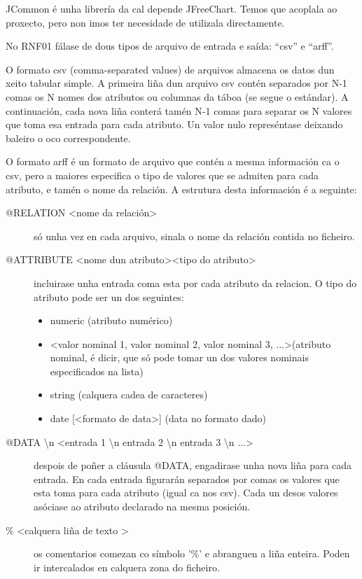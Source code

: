 JCommon é unha librería da cal depende JFreeChart. Temos que acoplala ao proxecto, pero non imos ter necesidade de utilizala directamente.


No RNF01 fálase de dous tipos de arquivo de entrada e saída: ``csv'' e ``arff''.

O formato csv (comma-separated values) de arquivos almacena os datos dun xeito tabular simple. A primeira liña dun arquivo csv contén separados por N-1 comas os N nomes dos atributos ou columnas da táboa (se segue o estándar). A continuación, cada nova liña conterá tamén N-1 comas para separar os N valores que toma esa entrada para cada atributo. Un valor nulo represéntase deixando baleiro o oco correspondente.

O formato arff  é un formato de arquivo que contén a mesma información ca o csv, pero a maiores especifica o tipo de valores que se admiten para cada atributo, e tamén o nome da relación. A estrutura desta información é a seguinte:

\begin{description}
\item[@RELATION \textless nome da relación\textgreater] só unha vez en cada arquivo, sinala o nome da relación contida no ficheiro.
\item[@ATTRIBUTE \textless nome dun atributo\textgreater \textless tipo do atributo\textgreater] incluirase unha entrada coma esta por cada atributo da relacion. O tipo do atributo pode ser un dos seguintes:
\begin{itemize}
\item numeric (atributo numérico)
\item \textless valor nominal 1, valor nominal 2, valor nominal 3, ...\textgreater (atributo nominal, é dicir, que só pode tomar un dos valores nominais especificados na lista)
\item string (calquera cadea de caracteres)
\item date [\textless formato de data\textgreater ] (data no formato dado)
\end{itemize} 
\item[@DATA \textbackslash n \textless entrada 1 \textbackslash n entrada 2 \textbackslash n entrada 3 \textbackslash n ...\textgreater] despois de poñer a cláusula @DATA, engadirase unha nova liña para cada entrada. En cada entrada figurarán separados por comas os valores que esta toma para cada atributo (igual ca nos csv). Cada un desos valores asóciase ao atributo declarado na mesma posición.
\item[\% \textless calquera liña de texto \textgreater] os comentarios comezan co símbolo '\%' e abranguen a liña enteira. Poden ir intercalados en calquera zona do ficheiro.
\end{description} 

